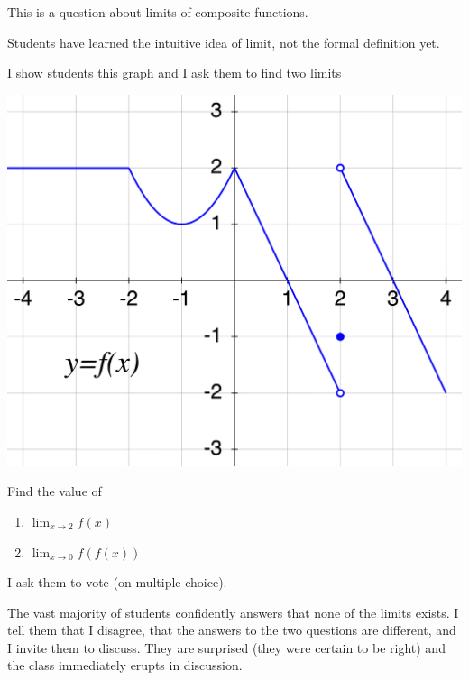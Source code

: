 \documentclass[11pt]{article}
\begin{document}
	\begin{example}
		\label{limits} This is a question about limits of composite functions.
		\begin{background}
			Students have learned the intuitive idea of limit, not the formal
			definition yet.
		\end{background}
		\begin{question}
			I show students this graph and I ask them to find two limits

			\begin{center}
				\hspace{2cm}
				\begin{minipage}{0.5\textwidth}
					\includegraphics[scale=.4]{EX2a}
				\end{minipage}
				\begin{minipage}{0.2\textwidth}
					Find the value of
					\begin{enumerate}
						\item ${\displaystyle \lim_{x \to 2} f(x)}$

						\item ${\displaystyle \lim_{x \to 0} f(f(x))}$
					\end{enumerate}
				\end{minipage}
			\end{center}
			I ask them to vote (on multiple choice).
		\end{question}
		\begin{comments}
			The vast majority of students confidently answers that none of the limits exists.
			I tell them that I disagree, that the answers to the two questions are different,
			and I invite them to discuss. They are surprised (they were certain to be
			right) and the class immediately erupts in discussion.


\end{comments}
\end{example}
\end{document}
